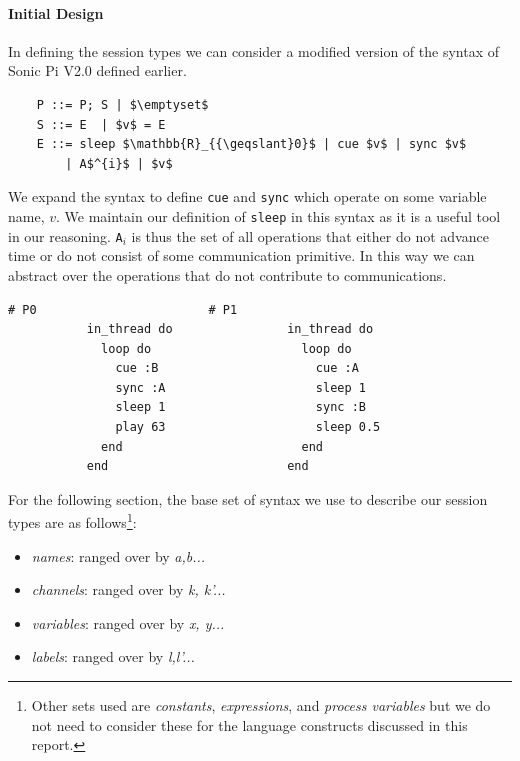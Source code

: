 \documentclass[11pt, abstracton, twoside]{scrartcl}
\begin{document}
\paragraph{Initial Design}
In defining the session types we can consider a modified version of the syntax 
of Sonic Pi V2.0 defined earlier.
\\
\begin{lstlisting}
	P ::= P; S | $\emptyset$
	S ::= E  | $v$ = E
	E ::= sleep $\mathbb{R}_{{\geqslant}0}$ | cue $v$ | sync $v$ 
	    | A$^{i}$ | $v$
\end{lstlisting}

We expand the syntax to define \texttt{cue} and \texttt{sync} which operate on
some variable name, $v$. We maintain our definition of \texttt{sleep} in this syntax 
as it is a useful tool in our reasoning. \texttt{A$_{i}$} is thus the set of all 
operations that either do not advance time or do not consist of some communication
primitive. In this way we can abstract over the operations that do not contribute 
to communications.

\begin{minipage}{\textwidth}
	\begin{lstlisting}[style = sonicpi]
           # P0                        # P1
           in_thread do                in_thread do 
             loop do                     loop do
               cue :B                      cue :A 
               sync :A                     sleep 1
               sleep 1                     sync :B
               play 63                     sleep 0.5
             end                         end
           end                         end
	\end{lstlisting}
	 \label{formTypes}
\end{minipage}

For the following section, the base set of syntax we use to describe our session
types are as follows\footnote{Other sets used are \emph{constants}, 
\emph{expressions}, and \emph{process variables} but we do not need to consider 
these for the language constructs discussed in this report.}:

\begin{itemize}[noitemsep]
  \item[] \emph{names}: ranged over by \emph{a,b...}
  \item[] \emph{channels}: ranged over by \emph{k, k'...}
  \item[] \emph{variables}: ranged over by \emph{x, y...}
  \item[] \emph{labels}: ranged over by \emph{l,l'...}
\end{itemize}
\end{document}
